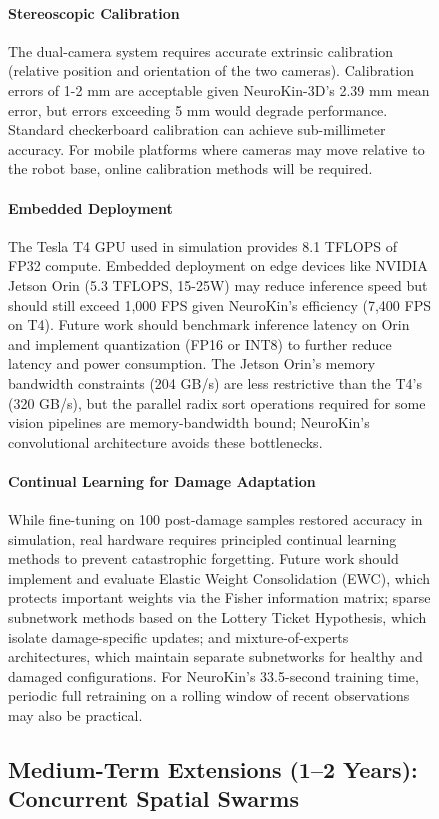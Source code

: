 \documentclass[12pt,a4paper,oneside]{report}
\begin{document}
\begin{figure}[H]
\paragraph{Stereoscopic Calibration}
The dual-camera system requires accurate extrinsic calibration (relative position and orientation of the two cameras). Calibration errors of 1-2 mm are acceptable given NeuroKin-3D's 2.39 mm mean error, but errors exceeding 5 mm would degrade performance. Standard checkerboard calibration can achieve sub-millimeter accuracy. For mobile platforms where cameras may move relative to the robot base, online calibration methods will be required.

\paragraph{Embedded Deployment}
The Tesla T4 GPU used in simulation provides 8.1 TFLOPS of FP32 compute. Embedded deployment on edge devices like NVIDIA Jetson Orin (5.3 TFLOPS, 15-25W) may reduce inference speed but should still exceed 1,000 FPS given NeuroKin's efficiency (7,400 FPS on T4). Future work should benchmark inference latency on Orin and implement quantization (FP16 or INT8) to further reduce latency and power consumption. The Jetson Orin's memory bandwidth constraints (204 GB/s) are less restrictive than the T4's (320 GB/s), but the parallel radix sort operations required for some vision pipelines are memory-bandwidth bound; NeuroKin's convolutional architecture avoids these bottlenecks.

\paragraph{Continual Learning for Damage Adaptation}
While fine-tuning on 100 post-damage samples restored accuracy in simulation, real hardware requires principled continual learning methods to prevent catastrophic forgetting. Future work should implement and evaluate Elastic Weight Consolidation (EWC), which protects important weights via the Fisher information matrix; sparse subnetwork methods based on the Lottery Ticket Hypothesis, which isolate damage-specific updates; and mixture-of-experts architectures, which maintain separate subnetworks for healthy and damaged configurations. For NeuroKin's 33.5-second training time, periodic full retraining on a rolling window of recent observations may also be practical.

\subsection{Medium-Term Extensions (1--2 Years): Concurrent Spatial Swarms}


\end{figure}
\end{document}
